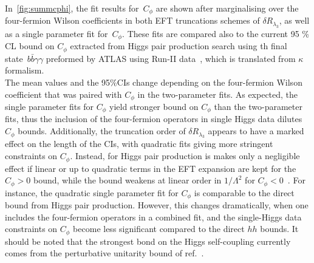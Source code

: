 	\par
	 In~\autoref{fig:summcphi}, the fit results for~$C_\phi$ are shown after marginalising over the four-fermion Wilson coefficients in both EFT truncations schemes of $\delta R_{\lambda_3}$, as well as a single parameter fit for~$C_{\phi}$. These fits are compared also to the current 95 \% CL bound on $C_\phi$ extracted from Higgs pair production search using th final state~$b\bar{b} \gamma \gamma$ preformed by ATLAS using Run-II data~\cite{ATLAS:2021jki}, which is translated from $\kappa$ formalism.\\ The mean values and the 95\%CIs change depending on the four-fermion Wilson coefficient that was paired with $C_\phi$ in the two-parameter fits. As expected, the single parameter fits for $C_\phi$ yield stronger bound on $C_\phi$ than the two-parameter fits, thus the inclusion of the four-fermion operators in single Higgs data dilutes $C_\phi$ bounds.  Additionally, the truncation order of  $\delta R_{\lambda_3}$ appears to have a marked effect on the length of the CIs, with quadratic fits giving more stringent constraints on $C_\phi$. Instead, for Higgs pair production  is makes only a negligible effect  if linear or up to quadratic terms in the EFT expansion are kept  for the $C_\phi>0$ bound, while the bound weakens at linear order in $1/\Lambda^2$ for $C_\phi<0$~\cite{IML}. For instance, the quadratic single parameter fit for $C_\phi$ is comparable to the direct bound from Higgs pair production. However, this changes dramatically, when one includes the four-fermion operators in a combined fit, and the single-Higgs data constraints on $C_\phi$ become less significant compared to the direct $hh$ bounds. It should be noted that the strongest bond on the Higgs self-coupling currently comes from the perturbative unitarity bound of ref.~\cite{DiLuzio:2017tfn}.
